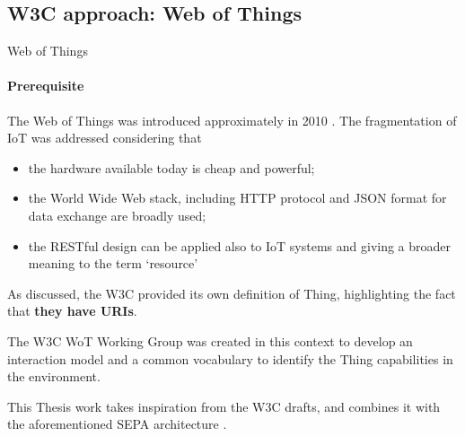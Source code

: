 \documentclass{beamer}
\begin{document}
\subsection{W3C approach: Web of Things}
\begin{frame}[allowframebreaks]{Web of Things}
\framesubtitle{Prerequisite}
\begin{flushleft}
The Web of Things was introduced approximately in 2010 \cite{guinard2010resource}. The fragmentation of IoT was addressed considering that
\begin{itemize}
    \item the hardware available today is cheap and powerful;
    \item the World Wide Web stack, including HTTP protocol and JSON format for data exchange are broadly used;
    \item the RESTful design can be applied also to IoT systems and giving a broader meaning to the term `resource'
\end{itemize}

\framebreak
As discussed, the W3C provided its own definition of Thing, highlighting the fact that \textbf{they have URIs}.

\vspace{3mm}
The W3C WoT Working Group was created in this context to develop an interaction model and a common vocabulary to identify the Thing capabilities in the environment.

\vspace{3mm}
This Thesis work takes inspiration from the W3C drafts, and combines it with the aforementioned SEPA architecture \cite{antoniazzi2019building}.
\end{flushleft}
\end{frame}
\end{document}
